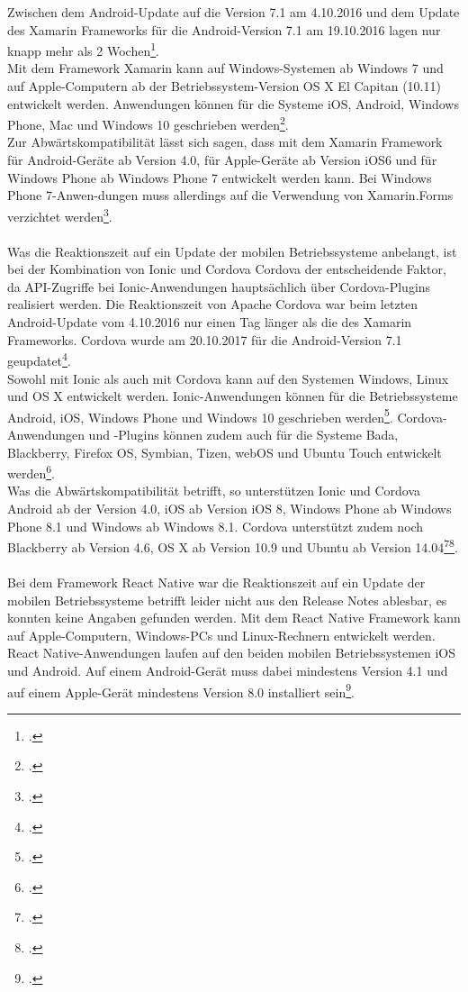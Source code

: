 Zwischen dem Android-Update auf die Version 7.1 am 4.10.2016 und dem Update des Xamarin Frameworks für die Android-Version 7.1 am 19.10.2016 lagen nur knapp mehr als 2 Wochen\footcite{XamarinHomepage}.
\\
Mit dem Framework Xamarin kann auf Windows-Systemen ab Windows 7 und auf Apple-Computern ab der Betriebssystem-Version OS X El Capitan (10.11) entwickelt werden. Anwendungen können für die Systeme iOS, Android, Windows Phone, Mac und Windows 10 geschrieben werden\footcite{XamarinHomepage}. 
\\
Zur Abwärtskompatibilität lässt sich sagen, dass mit dem Xamarin Framework für Android-Geräte ab Version 4.0, für Apple-Geräte ab Version iOS6 und für Windows Phone ab Windows Phone 7 entwickelt werden kann. Bei Windows Phone 7-Anwen-dungen muss allerdings auf die Verwendung von Xamarin.Forms verzichtet werden\footcite{XamarinHomepage}.
\\
\\
Was die Reaktionszeit auf ein Update der mobilen Betriebssysteme anbelangt, ist bei der Kombination von Ionic und Cordova Cordova der entscheidende Faktor, da API-Zugriffe bei Ionic-Anwendungen hauptsächlich über Cordova-Plugins realisiert werden. Die Reaktionszeit von Apache Cordova war beim letzten Android-Update vom 4.10.2016 nur einen Tag länger als die des Xamarin Frameworks. Cordova wurde am 20.10.2017 für die Android-Version 7.1 geupdatet\footcite{Cordova}.
\\
Sowohl mit Ionic als auch mit Cordova kann auf den Systemen Windows, Linux und OS X entwickelt werden. Ionic-Anwendungen können für die Betriebssysteme Android, iOS, Windows Phone und Windows 10 geschrieben werden\footcite{IonicHomepage}. Cordova-Anwendungen und -Plugins können zudem auch für die Systeme Bada, Blackberry, Firefox OS, Symbian, Tizen, webOS und Ubuntu Touch entwickelt werden\footcite{Cordova}. 
\\
Was die Abwärtskompatibilität betrifft, so unterstützen Ionic und Cordova Android ab der Version 4.0, iOS ab Version iOS 8, Windows Phone ab Windows Phone 8.1 und Windows ab Windows 8.1. Cordova unterstützt zudem noch Blackberry ab Version 4.6, OS X ab Version 10.9 und Ubuntu ab Version 14.04\footcite{Cordova}\footcite{IonicHomepage}. 
\\
\\
Bei dem Framework React Native war die Reaktionszeit auf ein Update der mobilen Betriebssysteme betrifft leider nicht aus den Release Notes ablesbar, es konnten keine Angaben gefunden werden. Mit dem React Native Framework kann auf Apple-Computern, Windows-PCs und Linux-Rechnern entwickelt werden. React Native-Anwendungen laufen auf den beiden mobilen Betriebssystemen iOS und Android. Auf einem Android-Gerät muss dabei mindestens Version 4.1 und auf einem Apple-Gerät mindestens Version 8.0 installiert sein\footcite{ReactNativeHomepage}. 

